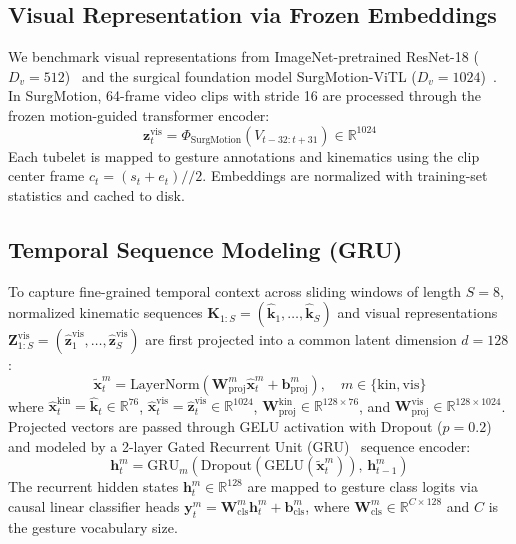\documentclass[10pt,journal]{IEEEtran}
\begin{document}
\subsection{Visual Representation via Frozen Embeddings}
We benchmark visual representations from ImageNet-pretrained ResNet-18 ($D_v=512$)~\cite{he2016deep} and the surgical foundation model SurgMotion-ViTL ($D_v=1024$)~\cite{wu2026surgmotion}. In SurgMotion, 64-frame video clips with stride 16 are processed through the frozen motion-guided transformer encoder:
\begin{equation}
\mathbf{z}_t^{\text{vis}} = \Phi_{\text{SurgMotion}}(V_{t-32:t+31}) \in \mathbb{R}^{1024}
\end{equation}
Each tubelet is mapped to gesture annotations and kinematics using the clip center frame $c_t = (s_t + e_t) // 2$. Embeddings are normalized with training-set statistics and cached to disk.

\subsection{Temporal Sequence Modeling (GRU)}
To capture fine-grained temporal context across sliding windows of length $S=8$, normalized kinematic sequences $\mathbf{K}_{1:S} = (\hat{\mathbf{k}}_1, \dots, \hat{\mathbf{k}}_S)$ and visual representations $\mathbf{Z}_{1:S}^{\text{vis}} = (\hat{\mathbf{z}}_1^{\text{vis}}, \dots, \hat{\mathbf{z}}_S^{\text{vis}})$ are first projected into a common latent dimension $d=128$:
\begin{equation}
\tilde{\mathbf{x}}_t^m = \text{LayerNorm}\left(\mathbf{W}_{\text{proj}}^m \hat{\mathbf{x}}_t^m + \mathbf{b}_{\text{proj}}^m\right), \quad m \in \{\text{kin}, \text{vis}\}
\end{equation}
where $\hat{\mathbf{x}}_t^{\text{kin}} = \hat{\mathbf{k}}_t \in \mathbb{R}^{76}$, $\hat{\mathbf{x}}_t^{\text{vis}} = \hat{\mathbf{z}}_t^{\text{vis}} \in \mathbb{R}^{1024}$, $\mathbf{W}_{\text{proj}}^{\text{kin}} \in \mathbb{R}^{128 \times 76}$, and $\mathbf{W}_{\text{proj}}^{\text{vis}} \in \mathbb{R}^{128 \times 1024}$. Projected vectors are passed through GELU activation with Dropout ($p=0.2$) and modeled by a 2-layer Gated Recurrent Unit (GRU)~\cite{cho2014learning} sequence encoder:
\begin{equation}
\mathbf{h}_t^m = \text{GRU}_m\!\left(\text{Dropout}(\text{GELU}(\tilde{\mathbf{x}}_t^m)),\, \mathbf{h}_{t-1}^m\right)
\end{equation}
The recurrent hidden states $\mathbf{h}_t^m \in \mathbb{R}^{128}$ are mapped to gesture class logits via causal linear classifier heads $\mathbf{y}_t^m = \mathbf{W}_{\text{cls}}^m \mathbf{h}_t^m + \mathbf{b}_{\text{cls}}^m$, where $\mathbf{W}_{\text{cls}}^m \in \mathbb{R}^{C \times 128}$ and $C$ is the gesture vocabulary size.
\end{document}
